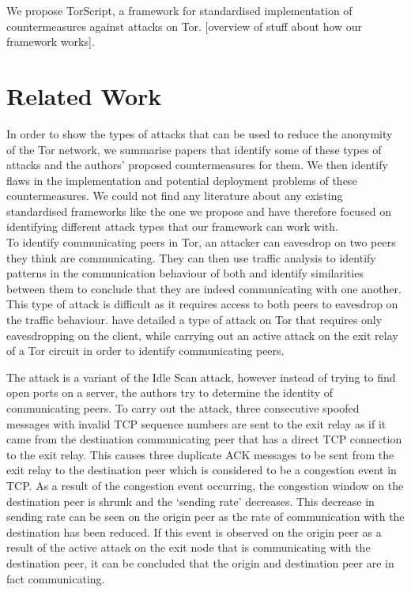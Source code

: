 \documentclass[9pt,technote]{IEEEtran}
\begin{document}
We propose TorScript, a framework for standardised implementation of countermeasures against attacks on Tor. [overview of stuff about how our framework works].

\cite{hayesguard}\cite{gilad2012spying}\cite{sun2015raptor}\cite{biryukov2012torscan}\cite{jansen2014sniper}\cite{tor}

\section{Related Work} In order to show the types of attacks that can be used to
reduce the anonymity of the Tor network, we summarise papers that identify some
of these types of attacks and the authors' proposed countermeasures for them. We
then identify flaws in the implementation and potential deployment problems of
these countermeasures. We could not find any literature about any existing
standardised frameworks like the one we propose and have therefore focused on
identifying different attack types that our framework can work with.\\

To identify communicating peers in Tor, an attacker can eavesdrop on two peers they think are communicating. They can then use traffic analysis to identify patterns in the communication behaviour of both and identify similarities between them to conclude that they are indeed communicating with one another. This type of attack is difficult as it requires access to both peers to eavesdrop on the traffic behaviour. \citeauthor{gilad2012spying} have detailed a type of attack on Tor that requires only eavesdropping on the client, while carrying out an active attack on the exit relay of a Tor circuit in order to identify communicating peers.

The attack is a variant of the Idle Scan attack, however instead of trying to find open ports on a server, the authors try to determine the identity of communicating peers. To carry out the attack, three consecutive spoofed messages with invalid TCP sequence numbers are sent to the exit relay as if it came from the destination communicating peer that has a direct TCP connection to the exit relay. This causes three duplicate ACK messages to be sent from the exit relay to the destination peer which is considered to be a congestion event in TCP. As a result of the congestion event occurring, the congestion window on the destination peer is shrunk and the `sending rate' decreases. This decrease in sending rate can be seen on the origin peer as the rate of communication with the destination has been reduced. If this event is observed on the origin peer as a result of the active attack on the exit node that is communicating with the destination peer, it can be concluded that the origin and destination peer are in fact communicating.
\end{document}
